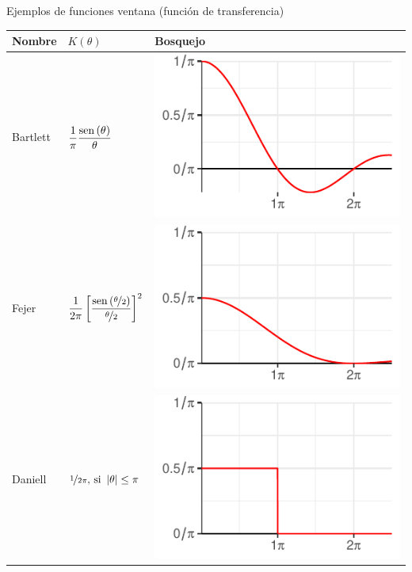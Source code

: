 \begin{SidewaysTable}
\caption{Ejemplos de funciones ventana (función de transferencia)}
\centering
\begin{tabular}{lll}
\toprule
Nombre & $K(\theta)$ & Bosquejo \\
\midrule
Bartlett &
$\displaystyle 
\frac{1}{\pi} \frac{\mathrm{sen}\left( \theta \right)}{\theta}
$
& \includegraphics[scale=.4]{./img_ventanas/ventana_2_bartlett.pdf} \\
\rowcolor{gris}
Fejer &
$\displaystyle 
\frac{1}{2\pi} \left[ \frac{\mathrm{sen}\left( \nicefrac{\theta}{2} \right)}{\nicefrac{\theta}{2}} \right]^{2}
$
& \includegraphics[scale=.4]{./img_ventanas/ventana_2_fejer.pdf} \\
Daniell &
$
\displaystyle 
\nicefrac{1}{2\pi} \text{, si } \left| \theta \right|\leq \pi
$
& \includegraphics[scale=.4]{./img_ventanas/ventana_2_daniell.pdf} \\

\end{tabular}
\end{SidewaysTable}
